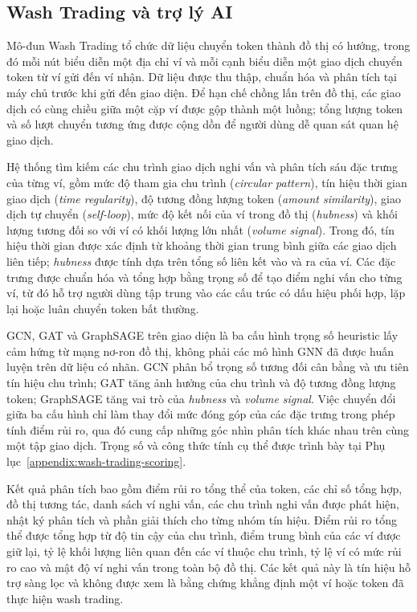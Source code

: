 \subsection{Wash Trading và trợ lý AI}

Mô-đun Wash Trading tổ chức dữ liệu chuyển token thành đồ thị có hướng, trong đó mỗi nút biểu diễn một địa chỉ ví và mỗi cạnh biểu diễn một giao dịch chuyển token từ ví gửi đến ví nhận. Dữ liệu được thu thập, chuẩn hóa và phân tích tại máy chủ trước khi gửi đến giao diện. Để hạn chế chồng lấn trên đồ thị, các giao dịch có cùng chiều giữa một cặp ví được gộp thành một luồng; tổng lượng token và số lượt chuyển tương ứng được cộng dồn để người dùng dễ quan sát quan hệ giao dịch.

Hệ thống tìm kiếm các chu trình giao dịch nghi vấn và phân tích sáu đặc trưng của từng ví, gồm mức độ tham gia chu trình (\textit{circular pattern}), tín hiệu thời gian giao dịch (\textit{time regularity}), độ tương đồng lượng token (\textit{amount similarity}), giao dịch tự chuyển (\textit{self-loop}), mức độ kết nối của ví trong đồ thị (\textit{hubness}) và khối lượng tương đối so với ví có khối lượng lớn nhất (\textit{volume signal}). Trong đó, tín hiệu thời gian được xác định từ khoảng thời gian trung bình giữa các giao dịch liên tiếp; \textit{hubness} được tính dựa trên tổng số liên kết vào và ra của ví. Các đặc trưng được chuẩn hóa và tổng hợp bằng trọng số để tạo điểm nghi vấn cho từng ví, từ đó hỗ trợ người dùng tập trung vào các cấu trúc có dấu hiệu phối hợp, lặp lại hoặc luân chuyển token bất thường.

GCN, GAT và GraphSAGE trên giao diện là ba cấu hình trọng số heuristic lấy cảm hứng từ mạng nơ-ron đồ thị, không phải các mô hình GNN đã được huấn luyện trên dữ liệu có nhãn. GCN phân bổ trọng số tương đối cân bằng và ưu tiên tín hiệu chu trình; GAT tăng ảnh hưởng của chu trình và độ tương đồng lượng token; GraphSAGE tăng vai trò của \textit{hubness} và \textit{volume signal}. Việc chuyển đổi giữa ba cấu hình chỉ làm thay đổi mức đóng góp của các đặc trưng trong phép tính điểm rủi ro, qua đó cung cấp những góc nhìn phân tích khác nhau trên cùng một tập giao dịch. Trọng số và công thức tính cụ thể được trình bày tại Phụ lục~\ref{appendix:wash-trading-scoring}.

Kết quả phân tích bao gồm điểm rủi ro tổng thể của token, các chỉ số tổng hợp, đồ thị tương tác, danh sách ví nghi vấn, các chu trình nghi vấn được phát hiện, nhật ký phân tích và phần giải thích cho từng nhóm tín hiệu. Điểm rủi ro tổng thể được tổng hợp từ độ tin cậy của chu trình, điểm trung bình của các ví được giữ lại, tỷ lệ khối lượng liên quan đến các ví thuộc chu trình, tỷ lệ ví có mức rủi ro cao và mật độ ví nghi vấn trong toàn bộ đồ thị. Các kết quả này là tín hiệu hỗ trợ sàng lọc và không được xem là bằng chứng khẳng định một ví hoặc token đã thực hiện wash trading.


